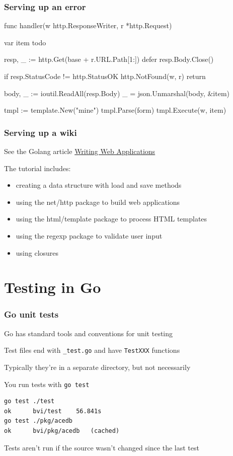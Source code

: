 \documentclass[handout,compress,t,11pt]{beamer}
\begin{document}
\begin{frame}[fragile]
    \frametitle{Serving up an error}
\begin{golang}
func handler(w http.ResponseWriter, r *http.Request) {
	var item todo

	resp, _ := http.Get(base + r.URL.Path[1:])
	defer resp.Body.Close()

    if resp.StatusCode != http.StatusOK {
        http.NotFound(w, r)
        return
    }

	body, _ := ioutil.ReadAll(resp.Body)
	_ = json.Unmarshal(body, &item)

	tmpl := template.New("mine")
	tmpl.Parse(form)
	tmpl.Execute(w, item)
}
\end{golang}
\end{frame}

\begin{frame}[fragile]
    \frametitle{Serving up a wiki}
    See the Golang article \href{https://golang.org/doc/articles/wiki/}%
    {Writing Web Applications} \par
    \vspace{\baselineskip}
    The tutorial includes:
    \begin{itemize}
        \item creating a data structure with load and save methods
        \item using the net/http package to build web applications
        \item using the html/template package to process HTML templates
        \item using the regexp package to validate user input
        \item using closures
    \end{itemize}
\end{frame}



\section{Testing in Go}
\begin{frame}[fragile]
    \frametitle{Go unit tests}
    Go has standard tools and conventions for unit testing \par
    \vspace{0.4\baselineskip}
    Test files end with \verb|_test.go| and have \verb|TestXXX| functions \par
    \vspace{0.4\baselineskip}
    Typically they're in a separate directory, but not necessarily \par
    \vspace{0.4\baselineskip}
    You run tests with \verb|go test| \par
\begin{verbatim}
go test ./test
ok  	bvi/test	56.841s
go test ./pkg/acedb
ok  	bvi/pkg/acedb	(cached)
\end{verbatim}
    \vspace{0.4\baselineskip}
    Tests aren't run if the source wasn't changed since the last test
\end{frame}
\end{document}
